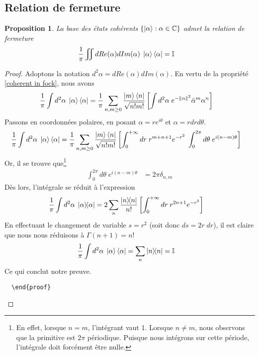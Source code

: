 \documentclass[11pt,oneside,a4paper]{article}
\newtheorem{property}[theorem]{Proposition}
\begin{document}
\subsection{Relation de fermeture}
\label{section relation de fermeture}
\begin{property}
  La base des états cohérents $\left\{\ket{\alpha} : \alpha\in\mathbb{C}\right\}$ admet la relation de fermeture
  \begin{align}
    \frac{1}{\pi}\iint dRe(\alpha)dIm(\alpha) \; \ket{\alpha}\bra{\alpha} &= \mathbb{I}
  \end{align}
\end{property}
\begin{proof}
  Adoptons la notation $d^2\alpha = dRe(\alpha)dIm(\alpha)$. En vertu de la propriété \ref{coherent in fock}, nous avons
  \begin{align}
    \frac{1}{\pi}\int d^2\alpha \; \ket{\alpha}\bra{\alpha} &= \frac{1}{\pi}\sum_{n,m\geq 0} \frac{\ket{m}\bra{n}}{\sqrt{n!m!}} \left[\int d^2\alpha \; e^{-\norm{\alpha}^{2}} \bar{\alpha}^m\alpha^n\right]\label{eq:fermeture}
  \end{align}
  Passons en coordonnées polaires, en posant $\alpha=re^{i\theta}$ et $\alpha = rdrd\theta$.
  \begin{align*}
    \frac{1}{\pi}\int d^2\alpha \; \ket{\alpha}\bra{\alpha} &= \frac{1}{\pi}\sum_{n,m\geq 0}\frac{\ket{m}\bra{n}}{\sqrt{n!m!}}\left[\int_0^{+\infty}dr\; r^{m+n+1}e^{-r^2} \; \int_0^{2\pi}d\theta \; e^{i\left(n-m\right)\theta}\right]
  \end{align*}
  Or, il se trouve que\footnote{En effet, lorsque $n=m$, l'intégrant vaut 1. Lorsque $n\neq m$, nous observons que la primitive est $2\pi$ périodique. Puisque nous intégrons sur cette période, l'intégrale doit forcément être nulle.}
  \begin{align*}
    \int_0^{2\pi}d\theta \; e^{i\left(n-m\right)\theta} &= 2\pi\delta_{n,m}
  \end{align*}
Dès lors, l'intégrale se réduit à l'expression
\begin{align*}
  \frac{1}{\pi}\int d^2\alpha \; \ketbra{\alpha} &= 2\sum_n \frac{\ketbra{n}}{n!}\left[\int_0^{+\infty}dr \; r^{2n+1}e^{-r^2} \right]
\end{align*}
En effectuant le changement de variable $s = r^2$ (soit donc $ds = 2r \; dr$), il est claire que nous nous réduisons à $\Gamma(n+1) = n!$
\begin{align*}
  \frac{1}{\pi}\int d^2\alpha \; \ket{\alpha}\bra{\alpha} &= \sum_n \ketbra{n} = \mathbb{I}
\end{align*}
Ce qui conclut notre preuve.
\begin{verbatim}
  \end{proof}
\end{verbatim}
\end{proof}
\end{document}
